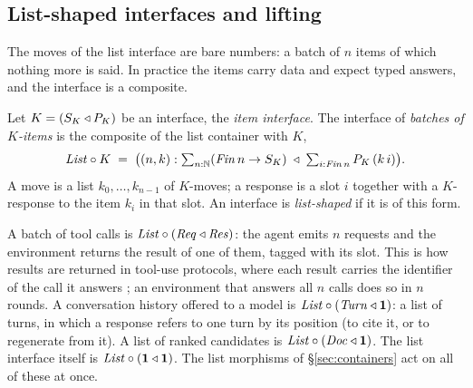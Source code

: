 \documentclass{fundam}
\begin{document}
\subsection{List-shaped interfaces and lifting}\label{sec:listshaped}

The moves of the list interface are bare numbers: a batch of $n$ items of which nothing
more is said.  In practice the items carry data and expect typed answers, and the
interface is a composite.

\begin{definition}\label{def:listshaped}
  Let $K = (S_K \triangleleft P_K)$ be an interface, the \emph{item interface}.  The interface of
  \emph{batches of $K$-items} is the composite of the list container with $K$,
  \[
    \mathit{List} \circ K \;=\; \big((n,k) : \textstyle\sum_{n:\mathbb{N}} (\mathit{Fin}\,n \to S_K)
       \;\triangleleft\; \textstyle\sum_{i:\mathit{Fin}\,n} P_K\,(k\,i)\big).
  \]
  A move is a list $k_0, \dots, k_{n-1}$ of $K$-moves; a response is a slot $i$ together
  with a $K$-response to the item $k_i$ in that slot.  An interface is
  \emph{list-shaped} if it is of this form.
\end{definition}

A batch of tool calls is $\mathit{List} \circ (\mathit{Req} \triangleleft \mathit{Res})$: the agent emits
$n$ requests and the environment returns the result of one of them, tagged with its slot.
This is how results are returned in tool-use protocols, where each result carries the
identifier of the call it answers \cite{OpenAIStructured24,MCP24}; an environment that
answers all $n$ calls does so in $n$ rounds.  A conversation history offered to a model
is $\mathit{List} \circ (\mathit{Turn} \triangleleft \mathbf{1})$: a list of turns, in which a
response refers to one turn by its position (to cite it, or to regenerate from it).  A
list of ranked candidates is $\mathit{List} \circ (\mathit{Doc} \triangleleft \mathbf{1})$.  The list
interface itself is $\mathit{List} \circ (\mathbf{1} \triangleleft \mathbf{1})$.  The list
morphisms of \S\ref{sec:containers} act on all of these at once.
\end{document}
